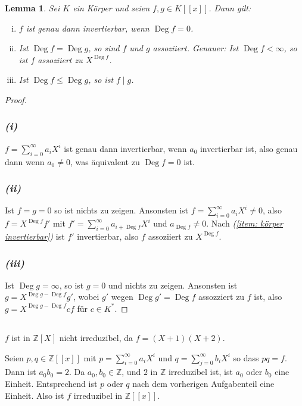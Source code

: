 \documentclass[a4paper,10pt]{article}
\newcounter{satze}
\newtheorem{lem}[satze]{Lemma}
\theoremstyle{definition}
\newcommand{\Z}{\mathbb{Z}}
\newcommand{\Deg}{\operatorname{Deg}}
\begin{document}
\begin{lem} \label{lem: starkes Lemma}
 Sei $K$ ein Körper und seien $f,g \in K[\![x]\!]$. Dann gilt:
 \begin{enumerate}[(i)]
  \item $f$ ist genau dann invertierbar, wenn $\Deg f = 0$. \label{item: körper invertierbar}
  \item Ist $\Deg f = \Deg g$, so sind $f$ und $g$ assoziiert. Genauer: Ist $\Deg f < \infty$, so ist $f$ assoziiert zu $X^{\Deg f}$.
  \item Ist $\Deg f \leq \Deg g$, so ist $f \mid g$.
 \end{enumerate}
\end{lem}
\begin{proof}
 \subsubsection*{\emph{(i)}}
  $f = \sum_{i=0}^{\infty} a_i X^i$ ist genau dann invertierbar, wenn $a_0$ invertierbar ist, also genau dann wenn $a_0 \neq 0$, was äquivalent zu $\Deg f = 0$ ist.
 \subsubsection*{\emph{(ii)}}
  Ist $f = g = 0$ so ist nichts zu zeigen. Ansonsten ist $f = \sum_{i=0}^\infty a_i X^i \neq 0$, also $f = X^{\Deg f} f'$ mit $f' = \sum_{i=0}^\infty a_{i+\Deg f} X^i$ und $a_{\Deg f} \neq 0$. Nach \emph{(\ref{item: körper invertierbar})} ist $f'$ invertierbar, also $f$ assoziiert zu $X^{\Deg f}$.
 \subsubsection*{\emph{(iii)}}
 Ist $\Deg g = \infty$, so ist $g = 0$ und nichts zu zeigen. Ansonsten ist $g = X^{\Deg g - \Deg f} g'$, wobei $g'$ wegen $\Deg g' = \Deg f$ assozziert zu $f$ ist, also $g = X^{\Deg g - \Deg f} c f$ für $c \in K^*$.
\end{proof}


\subsection{}
$f$ ist in $\Z[X]$ nicht irreduzibel, da $f = (X+1)(X+2)$.

Seien $p,q \in \Z[\![x]\!]$ mit $p = \sum_{i=0}^\infty a_i X^i$ und $q = \sum_{j=0}^\infty b_i X^i$ so dass $pq = f$. Dann ist $a_0 b_0 = 2$. Da $a_0, b_0 \in \Z$, und $2$ in $\Z$ irreduzibel ist, ist $a_0$ oder $b_0$ eine Einheit. Entsprechend ist $p$ oder $q$ nach dem vorherigen Aufgabenteil eine Einheit. Also ist $f$ irreduzibel in $\Z[\![x]\!]$.
\end{document}
